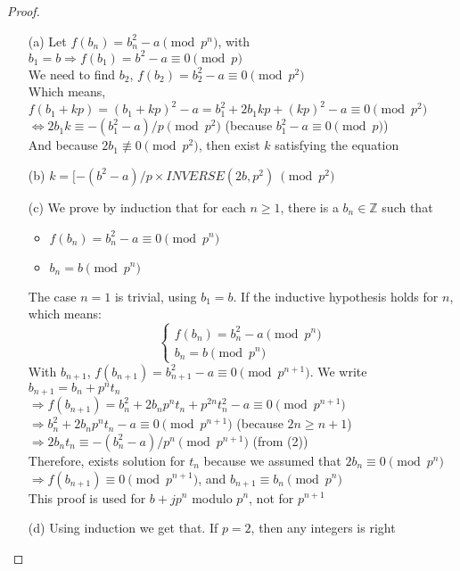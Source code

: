 \begin{proof}
\begin{enumerate}
    \item [(a)] Let $f(b_n)=b_n^2-a \pmod{p^n}$, with $b_1=b \Rightarrow f(b_1)=b^2-a\equiv 0 \pmod p$ \\ We need to find $b_2$, $f(b_2)=b_2^2-a \equiv 0 \pmod{p^2}$ \\ Which means, $f(b_1+kp)=(b_1+kp)^2-a=b_1^2+2b_1kp+(kp)^2-a \equiv 0 \pmod{p^2}$ \\ $\Leftrightarrow 2b_1k \equiv -(b_1^2-a)/p \pmod{p^2}$ (because $b_1^2-a \equiv 0 \pmod p$) \\ And because $2b_1 \not\equiv 0 \pmod{p^2}$, then exist $k$ satisfying the equation
    \item [(b)] $k=[-(b^2-a)/p \times INVERSE(2b, p^2)\ \pmod{p^2}$
    \item [(c)] We prove by induction that for each $n \geq 1$, there is a $b_n \in \mathbb{Z}$ such that \begin{itemize}
        \item $f(b_n)=b_n^2-a \equiv 0 \pmod{p^n}$
        \item $b_n=b \pmod{p^n}$
    \end{itemize}
    The case $n=1$ is trivial, using $b_1=b$. If the inductive hypothesis holds for $n$, which means: 
    \begin{equation}
        \begin{cases}
            f(b_n) = b_n^2 - a \pmod{p^n} \\
            b_n = b \pmod{p^n} 
        \end{cases}
    \end{equation}
    With $b_{n+1}$, $f(b_{n+1})=b_{n+1}^2-a \equiv 0 \pmod{p^{n+1}}$. We write $b_{n+1}=b_n+p^nt_n$ \\ $\Rightarrow f(b_{n+1})=b_n^2+2b_np^nt_n+p^{2n}t_n^2 - a \equiv 0 \pmod{p^{n+1}}$ \\ $\Rightarrow b_n^2+2b_np^nt_n-a \equiv 0 \pmod{p^{n+1}}$ (because $2n \geq n+1$) \\ $\Rightarrow 2b_nt_n \equiv -(b_n^2-a)/p^n \pmod{p^{n+1}}$ (from (2)) \\ Therefore, exists solution for $t_n$ because we assumed that $2b_n \equiv 0 \pmod{p^{n}}$ \\ $\Rightarrow f(b_{n+1}) \equiv 0 \pmod{p^{n+1}}$, and $b_{n+1} \equiv b_n \pmod{p^n}$ \\ This proof is used for $b+jp^n$ modulo $p^n$, not for $p^{n+1}$
    \item [(d)] Using induction we get that. If $p=2$, then any integers is right
\end{enumerate}
\end{proof}

